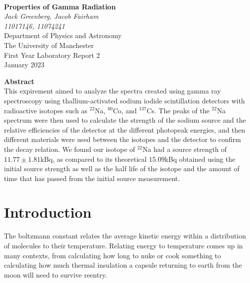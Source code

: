 \documentclass[12pt, a4paper]{article}
\begin{document}
\begin{center}

\noindent \\[10pt]
\color{black}

\thispagestyle{empty} %

\Large{\textbf{Properties of Gamma Radiation}} \\[30pt]
\normalsize \textit{Jack Greenberg, Jacob Fairham}\\[5pt]
\textit{11017146, 11074241}\\[20pt]
Department of Physics and Astronomy \\[5pt]
The University of Manchester \\[20pt]
First Year Laboratory Report 2 \\[20pt]
January 2023 \\[25pt]

\end{center}

\textbf{Abstract}\\[12pt]
This expirement aimed to analyze the spectra created using gamma ray spectroscopy using thallium-activated sodium iodide scintillation detectors with radioactive isotopes such as $^{22}$Na, $^{60}$Co, and $^{137}$Cs. The peaks of the $^{22}$Na spectrum were then used to calculate the strength of the sodium source and the relative efficiencies of the detector at the different photopeak energies, and then different materials were used between the isotopes and the detector to confirm the decay relation. We found our isotope of $^{22}$Na had a source strength of $11.77\pm1.81$kBq, as compared to its theoretical $15.09$kBq obtained using the initial source strength as well as the half life of the isotope and the amount of time that has passed from the initial source measurement.

\noindent 

\pagebreak

\section{Introduction}
		The boltzmann constant relates the average kinetic energy within a distribution of molecules to their temperature. Relating energy to temperature comes up in many contexts, from calculating how long to nuke or cook something to calculating how much thermal insulation a capsule returning to earth from the moon will need to survive reentry.
\end{document}
